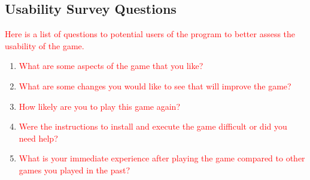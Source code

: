 \documentclass[12pt, titlepage]{article}
\begin{document}
\subsection{Usability Survey Questions}

\textcolor{red}{Here is a list of questions to potential users of the program to better assess the usability of the game.}

\begin{enumerate}

\item \textcolor{red}{What are some aspects of the game that you like?}
\item \textcolor{red}{What are some changes you would like to see that will improve the game?}
\item \textcolor{red}{How likely are you to play this game again? }
\item \textcolor{red}{Were the instructions to install and execute the game difficult or did you need help?}
\item \textcolor{red}{What is your immediate experience after playing the game compared to other games you played in the past?}

\end{enumerate}




\end{document}
